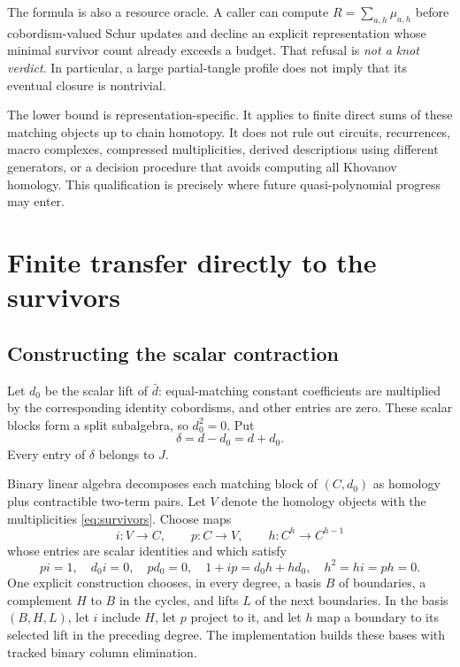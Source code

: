 \documentclass[11pt,letterpaper]{article}
\theoremstyle{definition}
\theoremstyle{remark}
\begin{document}
The formula is also a resource oracle. A caller can compute
$R=\sum_{a,h}\mu_{a,h}$ before cobordism-valued Schur updates and decline an
explicit representation whose minimal survivor count already exceeds a budget.
That refusal is \emph{not a knot verdict}. In particular, a large partial-tangle
profile does not imply that its eventual closure is nontrivial.

The lower bound is representation-specific. It applies to finite direct sums of
these matching objects up to chain homotopy. It does not rule out circuits,
recurrences, macro complexes, compressed multiplicities, derived descriptions
using different generators, or a decision procedure that avoids computing all
Khovanov homology. This qualification is precisely where future
quasi-polynomial progress may enter.

\section{Finite transfer directly to the survivors}
\label{sec:transfer}
\subsection{Constructing the scalar contraction}
Let $d_0$ be the scalar lift of $\bar d$: equal-matching constant coefficients
are multiplied by the corresponding identity cobordisms, and other entries
are zero. These scalar blocks form a split subalgebra, so $d_0^2=0$. Put
\[
 \delta=d-d_0=d+d_0.
\]
Every entry of $\delta$ belongs to $J$.

Binary linear algebra decomposes each matching block of $(C,d_0)$ as homology
plus contractible two-term pairs. Let $V$ denote the homology objects with the
multiplicities \cref{eq:survivors}. Choose maps
\[
 i:V\to C,\qquad p:C\to V,\qquad h:C^h\to C^{h-1}
\]
whose entries are scalar identities and which satisfy
\begin{equation}\label{eq:scalarcontraction}
 pi=1,\quad d_0i=0,\quad pd_0=0,\quad
 1+ip=d_0h+hd_0,\quad h^2=hi=ph=0.
\end{equation}
One explicit construction chooses, in every degree, a basis $B$ of boundaries,
a complement $H$ to $B$ in the cycles, and lifts $L$ of the next boundaries.
In the basis $(B,H,L)$, let $i$ include $H$, let $p$ project to it, and let $h$
map a boundary to its selected lift in the preceding degree. The implementation
builds these bases with tracked binary column elimination.
\end{document}
